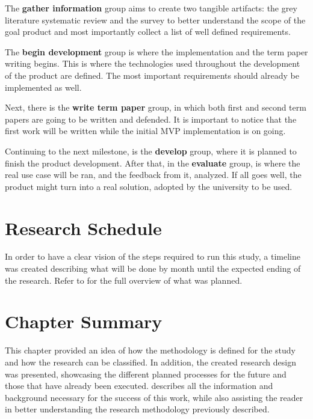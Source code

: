 The \textbf{gather information} group aims to create two tangible artifacts: the grey literature systematic review and the survey to better understand the scope of the goal product and most importantly collect a list of well defined requirements.

The \textbf{begin development} group is where the implementation and the term paper writing begins. This is where the technologies used throughout the development of the product are defined. The most important requirements should already be implemented as well.

Next, there is the \textbf{write term paper} group, in which both first and second term papers are going to be written and defended. It is important to notice that the first work will be written while the initial \ac{MVP} implementation is on going.

Continuing to the next milestone, is the \textbf{develop} group, where it is planned to finish the product development. After that, in the \textbf{evaluate} group, is where the real use case will be ran, and the feedback from it, analyzed. If all goes well, the product might turn into a real solution, adopted by the university to be used.

\section{Research Schedule}\label{sec:met-schedule}

In order to have a clear vision of the steps required to run this study, a timeline was created describing what will be done by month until the expected ending of the research. Refer to  for the full overview of what was planned.



\section{Chapter Summary}\label{sec:met-4}

This chapter provided an idea of how the methodology is defined for the study and how the research can be classified. In addition, the created research design was presented, showcasing the different planned processes for the future and those that have already been executed.  describes all the information and background necessary for the success of this work, while also assisting the reader in better understanding the research methodology previously described.

